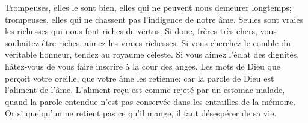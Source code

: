 Trompeuses, elles le sont bien, elles qui ne peuvent nous demeurer longtemps;
	trompeuses, elles qui ne chassent pas l'indigence de notre âme.
Seules sont vraies les richesses qui nous font riches de vertus.
Si donc, frères très chers, vous souhaitez être riches, aimez les vraies richesses.
Si vous cherchez le comble du véritable honneur, tendez au royaume céleste.
Si vous aimez l'éclat des dignités,
		hâtez-vous de vous faire inscrire à la cour des anges.
Les mots de Dieu que perçoit votre oreille, que votre âme les retienne:
	car la parole de Dieu est l'aliment de l'âme.
L'aliment reçu est comme rejeté par un estomac malade,
	quand la parole entendue n'est pas conservée dans les entrailles de la mémoire.
Or si quelqu'un ne retient pas ce qu'il mange, il faut désespérer de sa vie.
